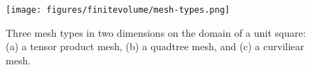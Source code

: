 \begin{figure}[ht]
    \centering
    \texttt{[image: figures/finitevolume/mesh-types.png]}
    \caption{Three mesh types in two dimensions on the domain of a unit square: (a) a tensor product mesh, (b) a quadtree mesh, and (c) a curviliear mesh.}
    \label{fig:finitevolume-mesh-types}
\end{figure}
